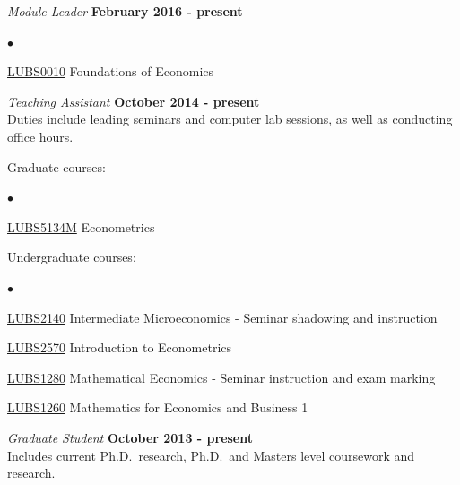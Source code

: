 \documentclass[margin,line,9pt]{res}
\newenvironment{list2}{
  \begin{list}{$\bullet$}{%
      \setlength{\itemsep}{0in}
      \setlength{\parsep}{0in} \setlength{\parskip}{0in}
      \setlength{\topsep}{0in} \setlength{\partopsep}{0in} 
      \setlength{\leftmargin}{0.2in}}}{\end{list}}
\begin{document}
\begin{resume}
{\em Module Leader} \hfill {\bf February 2016  - present}\\

\vspace*{-.1in}
\begin{list2}
\item \href{http://webprod3.leeds.ac.uk/catalogue/dynmodules.asp?Y=201617&F=P&M=LUBS-0010}{LUBS0010} Foundations of Economics
\end{list2}


{\em Teaching Assistant} \hfill {\bf October 2014  - present}\\
Duties include leading seminars and computer lab sessions, as well as conducting office hours.

Graduate courses:\\ 
\vspace*{-.1in}
\begin{list2}
\item \href{http://webprod3.leeds.ac.uk/catalogue/dynmodules.asp?Y=201415&M=LUBS-5134M}{LUBS5134M} Econometrics
\end{list2}

Undergraduate courses:\\
\vspace*{-.1in}
\begin{list2}
\item \href{http://webprod3.leeds.ac.uk/catalogue/dynmodules.asp?Y=201314&M=LUBS-2104}{LUBS2140} Intermediate Microeconomics - Seminar shadowing and instruction
\item \href{http://webprod3.leeds.ac.uk/catalogue/dynmodules.asp?Y=201415&M=LUBS-2570}{LUBS2570} Introduction to Econometrics
\item \href{http://webprod3.leeds.ac.uk/catalogue/dynmodules.asp?Y=201415&M=LUBS-1260}{LUBS1280} Mathematical Economics - Seminar instruction and exam marking
\item \href{http://webprod3.leeds.ac.uk/catalogue/dynmodules.asp?Y=201415&M=LUBS-1280}{LUBS1260} Mathematics for Economics and Business 1
\end{list2}

{\em Graduate Student} \hfill {\bf October 2013 - present}\\
Includes current Ph.D.~research, Ph.D.~and Masters level coursework and
research.


\end{resume}
\end{document}
